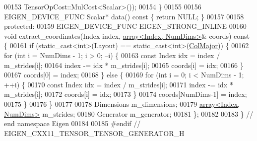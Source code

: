 \begin{DoxyCode}
00153                                   TensorOpCost::MulCost<Scalar>());
00154   \}
00155 
00156   EIGEN\_DEVICE\_FUNC Scalar* data()\textcolor{keyword}{ const }\{ \textcolor{keywordflow}{return} NULL; \}
00157 
00158  \textcolor{keyword}{protected}:
00159   EIGEN\_DEVICE\_FUNC EIGEN\_STRONG\_INLINE
00160   \textcolor{keywordtype}{void} extract\_coordinates(Index index, \hyperlink{class_eigen_1_1array}{array<Index, NumDims>}& coords)\textcolor{keyword}{ const }\{
00161     \textcolor{keywordflow}{if} (static\_cast<int>(Layout) == static\_cast<int>(\hyperlink{group__enums_ggaacded1a18ae58b0f554751f6cdf9eb13a0cbd4bdd0abcfc0224c5fcb5e4f6669a}{ColMajor})) \{
00162       \textcolor{keywordflow}{for} (\textcolor{keywordtype}{int} i = NumDims - 1; i > 0; --i) \{
00163         \textcolor{keyword}{const} Index idx = index / m\_strides[i];
00164         index -= idx * m\_strides[i];
00165         coords[i] = idx;
00166       \}
00167       coords[0] = index;
00168     \} \textcolor{keywordflow}{else} \{
00169       \textcolor{keywordflow}{for} (\textcolor{keywordtype}{int} i = 0; i < NumDims - 1; ++i) \{
00170         \textcolor{keyword}{const} Index idx = index / m\_strides[i];
00171         index -= idx * m\_strides[i];
00172         coords[i] = idx;
00173       \}
00174       coords[NumDims-1] = index;
00175     \}
00176   \}
00177 
00178   Dimensions m\_dimensions;
00179   \hyperlink{class_eigen_1_1array}{array<Index, NumDims>} m\_strides;
00180   Generator m\_generator;
00181 \};
00182 
00183 \} \textcolor{comment}{// end namespace Eigen}
00184 
00185 \textcolor{preprocessor}{#endif // EIGEN\_CXX11\_TENSOR\_TENSOR\_GENERATOR\_H}
\end{DoxyCode}
